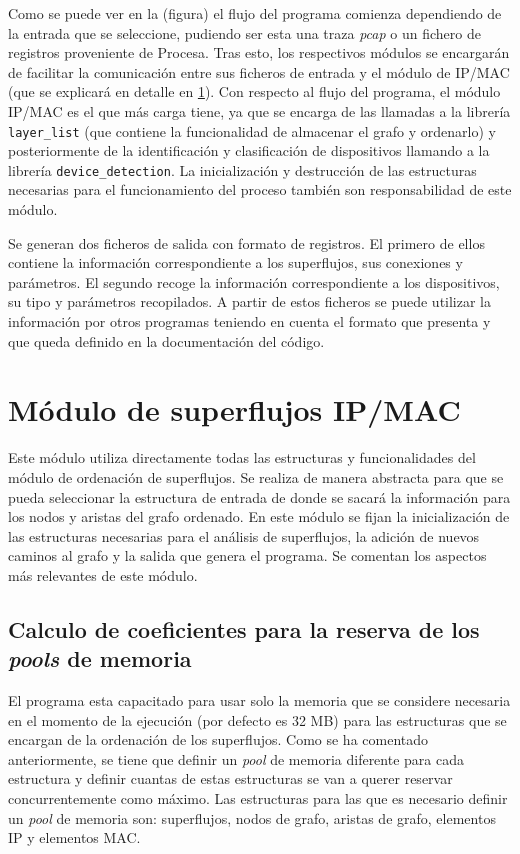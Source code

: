 \documentclass[twoside, 12pt]{epstfg}
\begin{document}
Como se puede ver en la (figura) el flujo del programa comienza dependiendo de la entrada que se seleccione, pudiendo ser esta una traza \textit{pcap} o un fichero de registros proveniente de Procesa. Tras esto, los respectivos módulos se encargarán de facilitar la comunicación entre sus ficheros de entrada y el módulo de IP/MAC (que se explicará en detalle en \ref{sec:Desarrollo:IPMAC}). Con respecto al flujo del programa, el módulo IP/MAC es el que más carga tiene, ya que se encarga de las llamadas a la librería \texttt{layer\_list} (que contiene la funcionalidad de almacenar el grafo y ordenarlo) y posteriormente de la identificación y clasificación de dispositivos llamando a la librería \texttt{device\_detection}. La inicialización y destrucción de las estructuras necesarias para el funcionamiento del proceso también son responsabilidad de este módulo.

Se generan dos ficheros de salida con formato de registros. El primero de ellos contiene la información correspondiente a los superflujos, sus conexiones y parámetros. El segundo recoge la información correspondiente a los dispositivos, su tipo y parámetros recopilados. A partir de estos ficheros se puede utilizar la información por otros programas teniendo en cuenta el formato que presenta y que queda definido en la documentación del código.

\section{Módulo de superflujos IP/MAC}
\label{sec:Desarrollo:IPMAC}
Este módulo utiliza directamente todas las estructuras y funcionalidades del módulo de ordenación de superflujos. Se realiza de manera abstracta para que se pueda seleccionar la estructura de entrada de donde se sacará la información para los nodos y aristas del grafo ordenado. En este módulo se fijan la inicialización de las estructuras necesarias para el análisis de superflujos, la adición de nuevos caminos al grafo y la salida que genera el programa. Se comentan los aspectos más relevantes de este módulo.

\subsection{Calculo de coeficientes para la reserva de los \textit{pools} de memoria}
\label{subsec:Desarrollo:IPMAC:CoefPools}
El programa esta capacitado para usar solo la memoria que se considere necesaria en el momento de la ejecución (por defecto es 32 MB) para las estructuras que se encargan de la ordenación de los superflujos. Como se ha comentado anteriormente, se tiene que definir un \textit{pool} de memoria diferente para cada estructura y definir cuantas de estas estructuras se van a querer reservar concurrentemente como máximo. Las estructuras para las que es necesario definir un \textit{pool} de memoria son: superflujos, nodos de grafo, aristas de grafo, elementos IP y elementos MAC.
\end{document}
